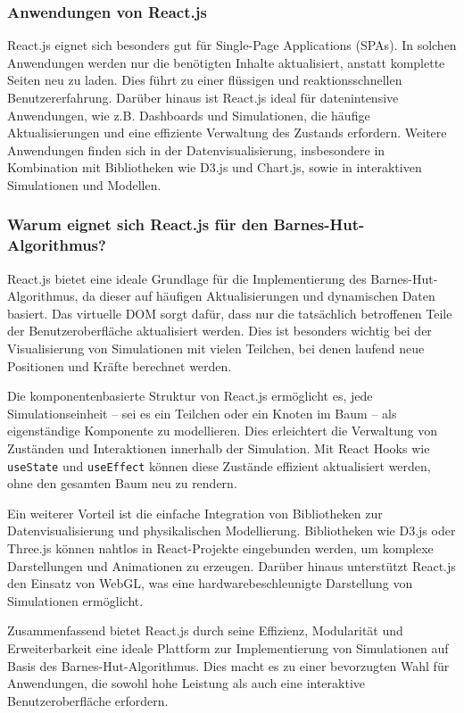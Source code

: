 \documentclass[a4paper,12pt,twoside]{article}
\begin{document}
\subsubsection{Anwendungen von React.js}
React.js eignet sich besonders gut für Single-Page Applications (SPAs). In solchen Anwendungen werden nur die benötigten Inhalte aktualisiert, anstatt komplette Seiten neu zu laden. Dies führt zu einer flüssigen und reaktionsschnellen Benutzererfahrung. Darüber hinaus ist React.js ideal für datenintensive Anwendungen, wie z.B. Dashboards und Simulationen, die häufige Aktualisierungen und eine effiziente Verwaltung des Zustands erfordern. Weitere Anwendungen finden sich in der Datenvisualisierung, insbesondere in Kombination mit Bibliotheken wie D3.js und Chart.js, sowie in interaktiven Simulationen und Modellen.

\subsubsection{Warum eignet sich React.js für den Barnes-Hut-Algorithmus?}
React.js bietet eine ideale Grundlage für die Implementierung des Barnes-Hut-Algorithmus, da dieser auf häufigen Aktualisierungen und dynamischen Daten basiert. Das virtuelle DOM sorgt dafür, dass nur die tatsächlich betroffenen Teile der Benutzeroberfläche aktualisiert werden. Dies ist besonders wichtig bei der Visualisierung von Simulationen mit vielen Teilchen, bei denen laufend neue Positionen und Kräfte berechnet werden.

Die komponentenbasierte Struktur von React.js ermöglicht es, jede Simulationseinheit -- sei es ein Teilchen oder ein Knoten im Baum -- als eigenständige Komponente zu modellieren. Dies erleichtert die Verwaltung von Zuständen und Interaktionen innerhalb der Simulation. Mit React Hooks wie \texttt{useState} und \texttt{useEffect} können diese Zustände effizient aktualisiert werden, ohne den gesamten Baum neu zu rendern.

Ein weiterer Vorteil ist die einfache Integration von Bibliotheken zur Datenvisualisierung und physikalischen Modellierung. Bibliotheken wie D3.js oder Three.js können nahtlos in React-Projekte eingebunden werden, um komplexe Darstellungen und Animationen zu erzeugen. Darüber hinaus unterstützt React.js den Einsatz von WebGL, was eine hardwarebeschleunigte Darstellung von Simulationen ermöglicht.

Zusammenfassend bietet React.js durch seine Effizienz, Modularität und Erweiterbarkeit eine ideale Plattform zur Implementierung von Simulationen auf Basis des Barnes-Hut-Algorithmus. Dies macht es zu einer bevorzugten Wahl für Anwendungen, die sowohl hohe Leistung als auch eine interaktive Benutzeroberfläche erfordern.
\end{document}
